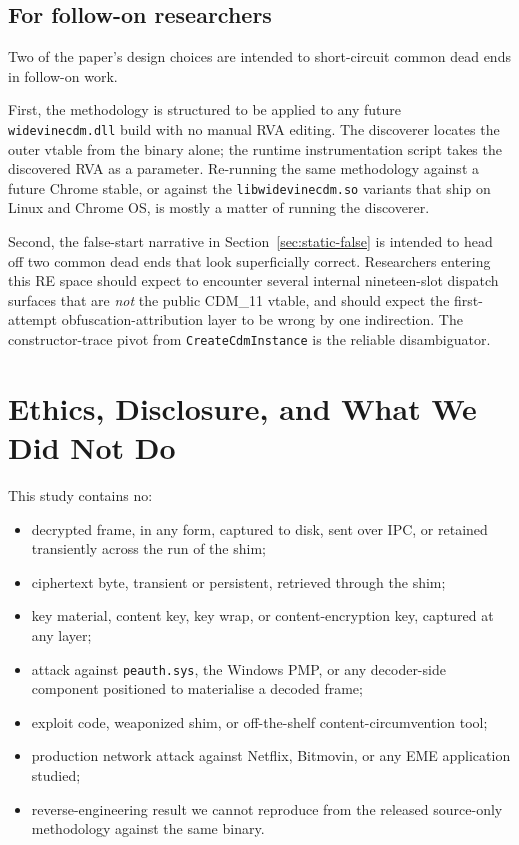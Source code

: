 \documentclass[11pt,letterpaper]{article}
\let\oldsection\section
\renewcommand{\section}{\clearpage\oldsection}
\begin{document}
\subsection*{For follow-on researchers}

Two of the paper's design choices are intended to short-circuit
common dead ends in follow-on work.

First, the methodology is structured to be applied to any future
\texttt{widevinecdm.dll} build with no manual RVA editing. The
discoverer locates the outer vtable from the binary alone; the
runtime instrumentation script takes the discovered RVA as a
parameter. Re-running the same methodology against a future Chrome
stable, or against the \texttt{libwidevinecdm.so} variants that
ship on Linux and Chrome OS, is mostly a matter of running the
discoverer.

Second, the false-start narrative in
Section~\ref{sec:static-false} is intended to head off two common
dead ends that look superficially correct. Researchers entering
this RE space should expect to encounter several internal
nineteen-slot dispatch surfaces that are \emph{not} the public
CDM\_11 vtable, and should expect the first-attempt
obfuscation-attribution layer to be wrong by one indirection. The
constructor-trace pivot from \texttt{CreateCdmInstance} is the
reliable disambiguator.

\section{Ethics, Disclosure, and What We Did Not Do}
\label{sec:ethics}

This study contains no:
\begin{itemize}[itemsep=1pt,topsep=2pt]
\item decrypted frame, in any form, captured to disk, sent over IPC,
      or retained transiently across the run of the shim;
\item ciphertext byte, transient or persistent, retrieved through
      the shim;
\item key material, content key, key wrap, or content-encryption
      key, captured at any layer;
\item attack against \texttt{peauth.sys}, the Windows PMP, or any
      decoder-side component positioned to materialise a decoded
      frame;
\item exploit code, weaponized shim, or off-the-shelf
      content-circumvention tool;
\item production network attack against Netflix, Bitmovin, or any
      EME application studied;
\item reverse-engineering result we cannot reproduce from the
      released source-only methodology against the same binary.
\end{itemize}
\end{document}

